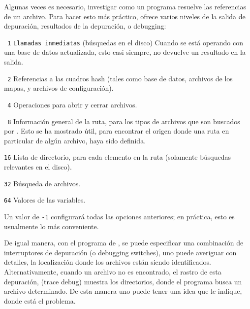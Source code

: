 \documentclass{article}
\begin{document}
Algunas veces es necesario, investigar como un programa resuelve las
referencias de un archivo. Para hacer esto más práctico, \KPS{} ofrece
varios niveles de la salida de depuración, resultados de la
depuración, o debugging:

 \begin{ttdescription} 
                    \item[\texttt{\ 1}] \texttt{Llamadas inmediatas}
                        (búsquedas en el disco) Cuando se está
                        operando con una base de datos 
                        actualizada, esto casi siempre, no devuelve un
                        resultado en la salida.
                    \item[\texttt{\ 2}] Referencias a las cuadros hash
                        (tales como  base de datos,
                        archivos de los mapas, y archivos de
                        configuración).  
                    \item[\texttt{\ 4}] Operaciones para abrir y cerrar
                        archivos.  
                    \item[\texttt{\ 8}] Información general de la
                        ruta, para los tipos de archivos que son
                        buscados por \KPS{}. Esto se ha mostrado útil,
                        para encontrar el origen donde una ruta en
                        particular de algún archivo, haya sido
                        definida.  
                     \item[\texttt{16}] Lista de directorio, para cada
                         elemento en la ruta (solamente búsquedas
                         relevantes en el disco).  
                     \item[\texttt{32}] Búsqueda de archivos.  
                     \item[\texttt{64}] Valores de las variables.  
 \end{ttdescription}
 Un valor de \texttt{-1} configurará todas las opciones
 anteriores; en práctica, esto es usualmente lo más
 conveniente. 

 De igual manera, con el programa de , se
 puede especificar una combinación de interruptores de
 depuración (o debugging switches), uno puede averiguar con
 detalles, la localización donde los archivos están siendo
 identificados. Alternativamente, cuando un archivo no es
 encontrado, el rastro de esta depuración, (trace debug)
 muestra los directorios, donde el programa busca un archivo
 determinado. De esta manera uno puede tener una
 idea que le indique, donde está el problema.
\end{document}
